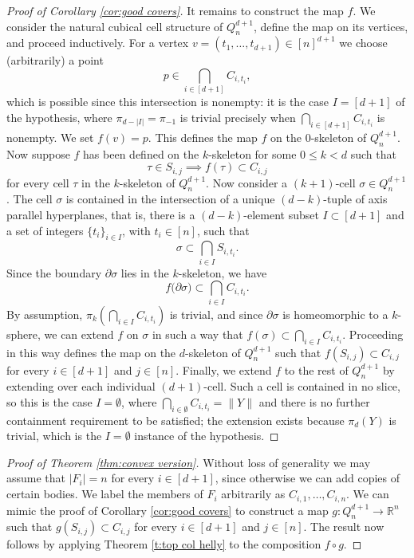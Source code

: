 \documentclass[12pt,a4paper,oneside]{amsart}\sloppy
\theoremstyle{definition}
\newcommand{\cubical}[2]{Q_{#1}^{#2}}
\newcommand{\bry}[1]{\partial #1}
\newcommand{\slice}[2]{S_{#1,#2} }
\begin{document}
\begin{proof}[Proof of Corollary \ref{cor:good covers}]
It remains to construct the map $f$. We consider the natural cubical cell structure of $\cubical{n}{d+1}$, define the map on its vertices, and proceed inductively. For a vertex $v = (t_1, \dots, t_{d+1}) \in [n]^{d+1}$ we choose (arbitrarily) a point 
\[p \in \bigcap_{i\in [d+1]} C_{i,t_i}, \]
which is possible since this intersection is nonempty: it is the case $I = [d+1]$ of the hypothesis, where $\pi_{d-|I|} = \pi_{-1}$ is trivial precisely when $\bigcap_{i\in [d+1]} C_{i,t_i}$ is nonempty. We set $f(v) = p$. This defines the map $f$ on the 0-skeleton of $\cubical{n}{d+1}$. 
Now suppose $f$ has been defined on the $k$-skeleton for some $0\leq k < d$ such that 
\[\tau \in \slice{i}{j} \implies f(\tau) \subset C_{i,j}\] for every cell $\tau$ in the $k$-skeleton of $\cubical{n}{d+1}$.
Now consider a $(k+1)$-cell $\sigma \in \cubical{n}{d+1}$. The cell $\sigma$ is contained in the intersection of a unique $(d-k)$-tuple of axis parallel hyperplanes, that is, there is a $(d-k)$-element subset $I\subset [d+1]$ and a set of integers $\{t_i\}_{i\in I}$, with $t_i \in [n]$, such that 
\[\sigma \subset \bigcap_{i\in I} \slice{i}{t_i}.\]
Since the boundary $\bry{\sigma}$ lies in the $k$-skeleton,  we have 
\[f\big( \bry{\sigma} \big) \subset  \bigcap_{i\in I} C_{i,t_i}. \]
By assumption,
$\pi_{k}(\bigcap_{i\in I}C_{i,t_i})$ is trivial, 
and since $\bry{\sigma}$ is homeomorphic to a $k$-sphere, we can extend $f$ on $\sigma$ in such a way  that $f(\sigma) \subset \bigcap_{i\in I} C_{i,t_i}$. Proceeding in this way defines the map on the $d$-skeleton of $\cubical{n}{d+1}$ such that $f(\slice{i}{j})\subset C_{i,j}$ for every $i\in [d+1]$ and $j\in [n]$. Finally, we extend $f$ to the rest of $\cubical{n}{d+1}$ by extending over each individual $(d+1)$-cell. Such a cell is contained in no slice, so this is the case $I = \emptyset$, where $\bigcap_{i\in \emptyset} C_{i,t_i} = \|Y\|$ and there is no further containment requirement to be satisfied; the extension exists because $\pi_d(Y)$ is trivial, which is the $I=\emptyset$ instance of the hypothesis.
\end{proof}


\begin{proof}[Proof of Theorem \ref{thm:convex version}]
Without loss of generality we may assume that $|F_i| = n$ for every $i \in [d+1]$, since otherwise we can add copies of certain bodies. We label the members of $F_i$ arbitrarily as 
$C_{i,1}, \dots, C_{i,n}$.  We can mimic the proof of Corollary \ref{cor:good covers} to construct a map $g \colon \cubical{n}{d+1} \to \mathbb{R}^n$ such that $g(\slice{i}{j})\subset C_{i,j}$ for every $i\in [d+1]$ and $j\in [n]$. The result now follows by applying Theorem \ref{t:top col helly} to the composition $f\circ g$.
\end{proof}
\end{document}
